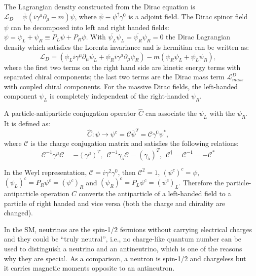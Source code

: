 The Lagrangian density constructed from the Dirac equation is $\mathcal{L}_D = \bar\psi(i\gamma^\mu\partial_\mu-m)\psi$, where $\bar{\psi}\equiv \psi^{\dag}\gamma^0$ is a adjoint field. The Dirac spinor field $\psi$ can be decomposed into left and right handed fields: $\psi=\psi_L+\psi_R\equiv P_L\psi+P_R\psi$. With $\overline{\psi_L}\psi_L=\overline{\psi_R}\psi_R=0$ the Dirac Lagrangian density which satisfies the Lorentz invariance and is hermitian can be written as\cite{zee2010quantum}:
\begin{equation}\label{diracLagrange}
\mathcal{L}_D = (\overline{\psi_L} i\gamma^\mu\partial_\mu\psi_L+\overline{{\psi}_R} i\gamma^\mu\partial_\mu\psi_R)-m(\overline{{\psi}_R}\psi_L+\overline{{\psi}_L}\psi_R),
\end{equation} 
where the first two terms on the right hand side are kinetic energy terms with separated chiral components; the last two terms are the Dirac mass term $\mathcal{L}^{D}_{mass}$ with coupled chiral components. For the massive Dirac fields, the left-handed component $\psi_L$ is completely independent of the right-handed $\psi_R$. 

A particle-antiparticle conjugation operator $\hat C$ can associate the $\psi_L$ with the $\psi_R$. It is defined as\cite{akhmedov2014majorana}:
\begin{equation}
\hat C: \psi\to \psi^c=\mathcal{C}\bar\psi^T=\mathcal{C}\gamma^0\psi^*,
\end{equation}
where $\mathcal C$ is the charge conjugation matrix and satisfies the following relations:
\begin{equation}
\mathcal C^{-1}\gamma^\mu\mathcal C=-(\gamma^\mu)^T,~~\mathcal{C}^{-1}\gamma_5\mathcal{C}=(\gamma_5)^T,~~\mathcal{C}^\dagger = \mathcal{C}^{-1}=-\mathcal{C}^*
\end{equation}

In the Weyl representation, $\mathcal{C}=i\gamma^2\gamma^0$, then $\mathcal {C}^2=1$, $(\psi^c)^c=\psi$, $(\psi_L)^c=P_R\psi^c=(\psi^c)_R$ and $(\psi_R)^c=P_L\psi^c=(\psi^c)_L$. Therefore the particle-antiparticle operation $\hat C$ converts the antiparticle of a left-handed field to a particle of right handed and vice versa (both the charge and chirality are changed).

In the SM, neutrinos are the spin-1/2 fermions without carrying electrical charges and they could be ``truly neutral'', i.e., no charge-like quantum number can be used to distinguish a neutrino and an antineutrino, which is one of the reasons why they are special. As a comparison, a neutron is spin-1/2 and chargeless but it carries magnetic moments opposite to an antineutron\cite{akhmedov2014majorana}.

